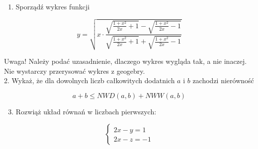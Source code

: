 \documentclass[10pt]{article}
\begin{document}
\begin{enumerate}
  \item Sporządź wykres funkcji
\end{enumerate}

\[
y=\sqrt{x \cdot \frac{\sqrt{\frac{1+x^{2}}{2 x}+1}-\sqrt{\frac{1+x^{2}}{2 x}-1}}{\sqrt{\frac{1+x^{2}}{2 x}+1}+\sqrt{\frac{1+x^{2}}{2 x}-1}}}
\]

Uwaga! Należy podać uzasadnienie, dlaczego wykres wygląda tak, a nie inaczej. Nie wystarczy przerysować wykres z geogebry.\\
2. Wykaż, że dla dowolnych liczb całkowitych dodatnich \(a\) i \(b\) zachodzi nierówność

\[
a+b \leq N W D(a, b)+N W W(a, b)
\]

\begin{enumerate}
  \setcounter{enumi}{2}
  \item Rozwiąż układ równań w liczbach pierwszych:
\end{enumerate}

\[
\left\{\begin{array}{c}
2 x-y=1 \\
2 x-z=-1
\end{array}\right.
\]
\end{document}
